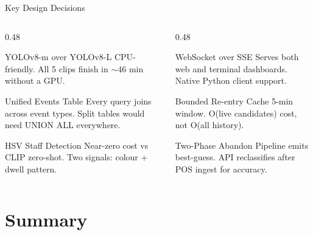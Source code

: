 \documentclass[aspectratio=169, 11pt]{beamer}
\begin{document}
\begin{frame}{Key Design Decisions}
  \begin{columns}[T]
    \begin{column}{0.48\textwidth}
      \begin{block}{YOLOv8-m over YOLOv8-L}
        CPU-friendly. All 5 clips finish in
        $\sim$46 min without a GPU.
      \end{block}

      \vspace{0.15cm}
      \begin{block}{Unified Events Table}
        Every query joins across event types.
        Split tables would need UNION ALL everywhere.
      \end{block}

      \vspace{0.15cm}
      \begin{block}{HSV Staff Detection}
        Near-zero cost vs CLIP zero-shot.
        Two signals: colour + dwell pattern.
      \end{block}
    \end{column}
    \begin{column}{0.48\textwidth}
      \begin{block}{WebSocket over SSE}
        Serves both web and terminal dashboards.
        Native Python client support.
      \end{block}

      \vspace{0.15cm}
      \begin{block}{Bounded Re-entry Cache}
        5-min window. O(live candidates) cost,
        not O(all history).
      \end{block}

      \vspace{0.15cm}
      \begin{block}{Two-Phase Abandon}
        Pipeline emits best-guess. API reclassifies
        after POS ingest for accuracy.
      \end{block}
    \end{column}
  \end{columns}
\end{frame}

\section{Summary}
\end{document}
